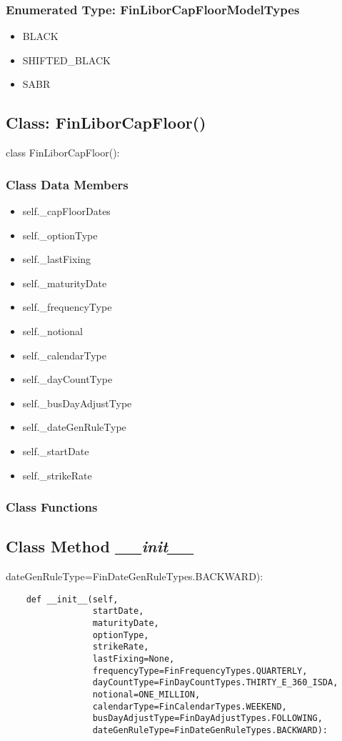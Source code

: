 \documentclass[twoside,11pt]{book}
\begin{document}
\subsubsection{Enumerated Type: FinLiborCapFloorModelTypes}
\begin{itemize}
\item{BLACK}
\item{SHIFTED\_BLACK}
\item{SABR}
\end{itemize}

\subsection{Class: FinLiborCapFloor()}
class FinLiborCapFloor():

\subsubsection{Class Data Members}
\begin{itemize}
\item{self.\_capFloorDates}
\item{self.\_optionType}
\item{self.\_lastFixing}
\item{self.\_maturityDate}
\item{self.\_frequencyType}
\item{self.\_notional}
\item{self.\_calendarType}
\item{self.\_dayCountType}
\item{self.\_busDayAdjustType}
\item{self.\_dateGenRuleType}
\item{self.\_startDate}
\item{self.\_strikeRate}
\end{itemize}

\subsubsection{Class Functions}

\subsection{Class Method {\it \_\_init\_\_}}
dateGenRuleType=FinDateGenRuleTypes.BACKWARD):

\begin{lstlisting}
    def __init__(self,
                 startDate,
                 maturityDate,
                 optionType,
                 strikeRate,
                 lastFixing=None,
                 frequencyType=FinFrequencyTypes.QUARTERLY,
                 dayCountType=FinDayCountTypes.THIRTY_E_360_ISDA,
                 notional=ONE_MILLION,
                 calendarType=FinCalendarTypes.WEEKEND,
                 busDayAdjustType=FinDayAdjustTypes.FOLLOWING,
                 dateGenRuleType=FinDateGenRuleTypes.BACKWARD):
\end{lstlisting}
\end{document}
